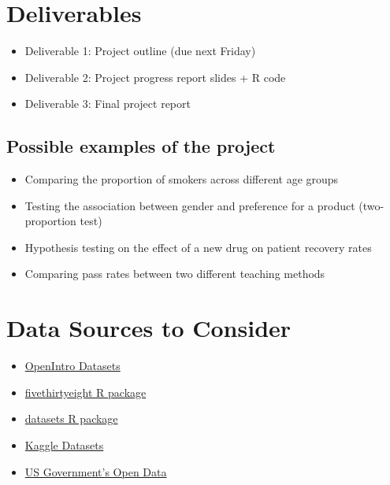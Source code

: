 \documentclass[12pt]{article}
\begin{document}
\section*{Deliverables}

\begin{itemize}
    \item Deliverable 1: Project outline (due next Friday)  
    \item Deliverable 2: Project progress report slides + R code 
    \item Deliverable 3: Final project report  
\end{itemize}

\subsection*{Possible examples of the project}

\begin{itemize}
    \item Comparing the proportion of smokers across different age groups  
    \item Testing the association between gender and preference for a product (two-proportion test)  
    \item Hypothesis testing on the effect of a new drug on patient recovery rates  
    \item Comparing pass rates between two different teaching methods  
\end{itemize}

\section*{Data Sources to Consider}

\begin{itemize}
    \item \href{https://www.openintro.org/data/}{OpenIntro Datasets}  
    \item \href{https://cran.r-project.org/web/packages/fivethirtyeight/vignettes/fivethirtyeight.html}{fivethirtyeight R package}  
    \item \href{https://stat.ethz.ch/R-manual/R-devel/library/datasets/html/00Index.html}{datasets R package}  
    \item \href{https://www.kaggle.com/datasets}{Kaggle Datasets}  
    \item \href{https://data.gov/}{US Government’s Open Data}  
\end{itemize}
\end{document}
